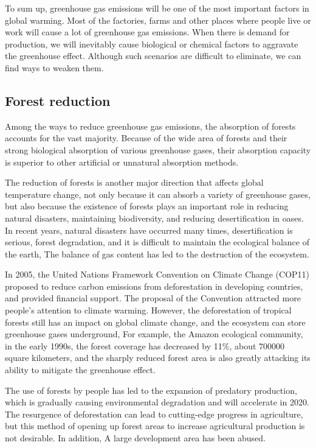 \documentclass{apmcmthesis}
\begin{document}
To sum up, greenhouse gas emissions will be one of the most important factors in global warming. Most of the factories, farms and other places where people live or work will cause a lot of greenhouse gas emissions. When there is demand for production, we will inevitably cause biological or chemical factors to aggravate the greenhouse effect. Although such scenarios are difficult to eliminate, we can find ways to weaken them.

\subsection{Forest reduction}
Among the ways to reduce greenhouse gas emissions, the absorption of forests accounts for the vast majority. Because of the wide area of forests and their strong biological absorption of various greenhouse gases, their absorption capacity is superior to other artificial or unnatural absorption methods.

The reduction of forests is another major direction that affects global temperature change, not only because it can absorb a variety of greenhouse gases, but also because the existence of forests plays an important role in reducing natural disasters, maintaining biodiversity, and reducing desertification in oases. In recent years, natural disasters have occurred many times, desertification is serious, forest degradation, and it is difficult to maintain the ecological balance of the earth, The balance of gas content has led to the destruction of the ecosystem.

In 2005, the United Nations Framework Convention on Climate Change (COP11) proposed to reduce carbon emissions from deforestation in developing countries, and provided financial support. The proposal of the Convention attracted more people's attention to climate warming. However, the deforestation of tropical forests still has an impact on global climate change, and the ecosystem can store greenhouse gases underground, For example, the Amazon ecological community, in the early 1990s, the forest coverage has decreased by 11$\%$, about 700000 square kilometers, and the sharply reduced forest area is also greatly attacking its ability to mitigate the greenhouse effect.

The use of forests by people has led to the expansion of predatory production, which is gradually causing environmental degradation and will accelerate in 2020. The resurgence of deforestation can lead to cutting-edge progress in agriculture, but this method of opening up forest areas to increase agricultural production is not desirable. In addition, A large development area has been abused.
\end{document}
